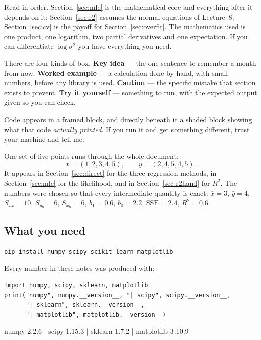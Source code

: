 \documentclass[11pt]{article}
\begin{document}
Read in order. Section~\ref{sec:mle} is the mathematical core and everything
after it depends on it; Section~\ref{sec:r2} assumes the normal equations of
Lecture~8; Section~\ref{sec:cv} is the payoff for
Section~\ref{sec:overfit}. The mathematics used is one product, one logarithm,
two partial derivatives and one expectation. If you can differentiate
$\log \sigma^2$ you have everything you need.

There are four kinds of box. \textbf{Key idea} --- the one sentence to
remember a month from now. \textbf{Worked example} --- a calculation done by
hand, with small numbers, before any library is used. \textbf{Caution} --- the
specific mistake that section exists to prevent. \textbf{Try it yourself} ---
something to run, with the expected output given so you can check.

Code appears in a framed block, and directly beneath it a shaded block showing
what that code \emph{actually printed}. If you run it and get something
different, trust your machine and tell me.

One set of five points runs through the whole document:
\[
  x = (1,2,3,4,5), \qquad y = (2,4,5,4,5).
\]
It appears in Section~\ref{sec:direct} for the three regression methods, in
Section~\ref{sec:mle} for the likelihood, and in Section~\ref{sec:r2hand} for
$R^2$. The numbers were chosen so that every intermediate quantity is exact:
$\bar x = 3$, $\bar y = 4$, $S_{xx} = 10$, $S_{yy} = 6$, $S_{xy} = 6$,
$b_1 = 0.6$, $b_0 = 2.2$, $\mathrm{SSE} = 2.4$, $R^2 = 0.6$.

\subsection{What you need}

\begin{lstlisting}
pip install numpy scipy scikit-learn matplotlib
\end{lstlisting}

Every number in these notes was produced with:

\begin{lstlisting}
import numpy, scipy, sklearn, matplotlib
print("numpy", numpy.__version__, "| scipy", scipy.__version__,
      "| sklearn", sklearn.__version__,
      "| matplotlib", matplotlib.__version__)
\end{lstlisting}
\begin{codeout}
numpy 2.2.6 | scipy 1.15.3 | sklearn 1.7.2 | matplotlib 3.10.9
\end{codeout}
\end{document}
